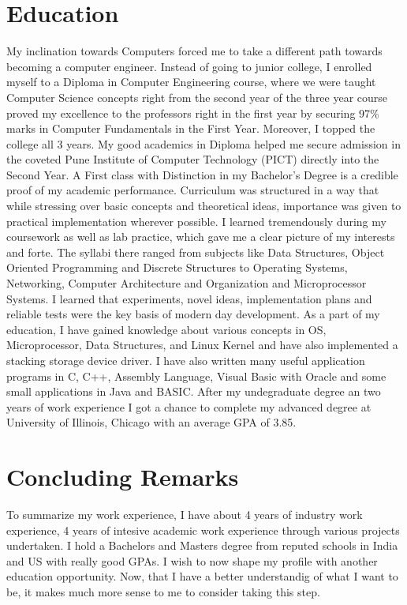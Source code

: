 \documentclass[letterpaper]{article}
\begin{document}
\section*{Education}
My inclination towards Computers forced me to take a different path towards becoming a computer engineer. 
Instead of going to junior college, I enrolled myself to a Diploma in Computer Engineering course, 
where we were taught Computer Science concepts right from the second year of the three year course proved my 
excellence to the professors right in the first year by securing 97\% marks in Computer Fundamentals in 
the First Year. Moreover, I topped the college all 3 years. My good academics in Diploma helped me secure admission 
in the coveted Pune Institute of Computer Technology (PICT) directly into the Second Year. 
A First class with Distinction in my Bachelor's Degree is a credible proof of my academic performance. 
Curriculum was structured in a way that while stressing over basic concepts and theoretical ideas, 
importance was given to practical implementation wherever possible.  
I learned tremendously during my coursework as well as lab practice, which gave me a clear 
picture of my interests and forte. The syllabi there ranged from subjects like Data Structures, 
Object Oriented Programming and Discrete Structures to Operating Systems, Networking, Computer Architecture 
and Organization and Microprocessor Systems. I learned that experiments, novel ideas, implementation plans 
and reliable tests were the key basis of modern day development. As a part of my education, I have gained knowledge about various concepts in OS, 
Microprocessor, Data Structures, and Linux Kernel and have also implemented a stacking storage device driver. 
I have also written many useful application programs in C, C++, Assembly Language, Visual Basic with Oracle and some small applications in Java and BASIC.
After my undegraduate degree an two years of work experience I got a chance to complete my advanced degree at University of Illinois, Chicago with an
average GPA of 3.85.

\pagebreak

\section*{Concluding Remarks}
To summarize my work experience, I have about 4 years of industry work experience, 4
years of intesive academic work experience through various projects undertaken. 
I hold a Bachelors and Masters degree from reputed schools in India and US with really good GPAs.
I wish to now shape my profile with another education opportunity. Now, that I have a better
understandig of what I want to be, it makes much more sense to me to consider taking this step.
\end{document}
